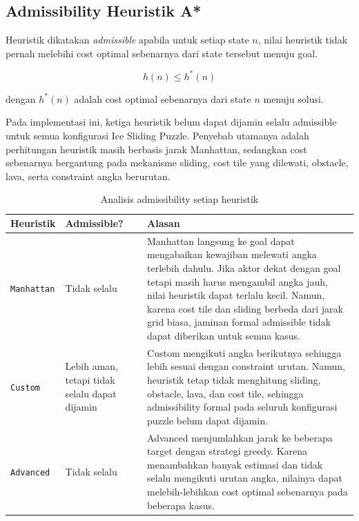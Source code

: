 \subsection{Admissibility Heuristik A*}

Heuristik dikatakan \textit{admissible} apabila untuk setiap state $n$, nilai heuristik tidak pernah melebihi cost optimal sebenarnya dari state tersebut menuju goal.

\[
	h(n) \leq h^*(n)
\]

dengan $h^*(n)$ adalah cost optimal sebenarnya dari state $n$ menuju solusi.

\begin{tcolorbox}[
	colback=green!5,
	colframe=green!50!black,
	title=\textbf{Analisis Admissibility pada Heuristik Program},
	arc=2mm,
	boxrule=0.8pt
]
Pada implementasi ini, ketiga heuristik belum dapat dijamin selalu admissible untuk semua konfigurasi Ice Sliding Puzzle. 
Penyebab utamanya adalah perhitungan heuristik masih berbasis jarak Manhattan, sedangkan cost sebenarnya bergantung pada mekanisme sliding, cost tile yang dilewati, obstacle, lava, serta constraint angka berurutan.
\end{tcolorbox}

\begin{table}[H]
	\centering
	\caption{Analisis admissibility setiap heuristik}
	\begin{tabular}{|p{3cm}|p{3cm}|p{8cm}|}
		\hline
		\rowcolor{green!15}
		\textbf{Heuristik} & \textbf{Admissible?} & \textbf{Alasan} \\
		\hline
		\texttt{Manhattan} & Tidak selalu & Manhattan langsung ke goal dapat mengabaikan kewajiban melewati angka terlebih dahulu. Jika aktor dekat dengan goal tetapi masih harus mengambil angka jauh, nilai heuristik dapat terlalu kecil. Namun, karena cost tile dan sliding berbeda dari jarak grid biasa, jaminan formal admissible tidak dapat diberikan untuk semua kasus. \\
		\hline
		\texttt{Custom} & Lebih aman, tetapi tidak selalu dapat dijamin & Custom mengikuti angka berikutnya sehingga lebih sesuai dengan constraint urutan. Namun, heuristik tetap tidak menghitung sliding, obstacle, lava, dan cost tile, sehingga admissibility formal pada seluruh konfigurasi puzzle belum dapat dijamin. \\
		\hline
		\texttt{Advanced} & Tidak selalu & Advanced menjumlahkan jarak ke beberapa target dengan strategi greedy. Karena menambahkan banyak estimasi dan tidak selalu mengikuti urutan angka, nilainya dapat melebih-lebihkan cost optimal sebenarnya pada beberapa kasus. \\
		\hline
	\end{tabular}
\end{table}

